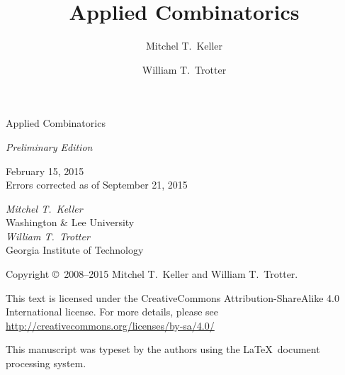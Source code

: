\documentclass[letterpaper,chapterprefix,numbers=noenddot,fontsize=10pt]{scrbook}
\numberwithin{figure}{chapter}
\numberwithin{section}{chapter}
\begin{document}
\begin{titlepage}
\begin{center}
\parbox{1in}{}

\vspace{.6in}
\Huge{\textsf{Applied Combinatorics}}

\vspace{24pt}
\LARGE{\textsf{\textsl{Preliminary Edition}}}
\vspace{36pt}

\Large{\textsf{February 15, 2015}}\\
\small{\textsf{Errors corrected as of September 21, 2015}}

\vfill \LARGE{\textsf{\textsl{Mitchel T.\
      Keller}}}\\\Large{\textsf{Washington \& Lee University}}\\\vspace{12pt}\LARGE{\textsf{\textsl{William T.\ Trotter}}}\\
  \Large{\textsf{Georgia Institute of Technology}}
\end{center}
\end{titlepage}
\thispagestyle{empty}
\parbox{1in}{ }
\vskip4.75in

\begin{center}
  \textsf{Copyright \copyright\ 2008--2015 Mitchel T.\ Keller and William
    T.\ Trotter.}

  \vspace{12pt}
  \textsf{This text is licensed under the CreativeCommons Attribution-ShareAlike 4.0 International license. For more details, please see
    \url{http://creativecommons.org/licenses/by-sa/4.0/}\\{\Huge \ccbysa}}
  


  \vspace{12pt}
  \textsf{This manuscript was typeset by the authors using the 
    \LaTeX\ document processing system.}
\end{center}


\author{Mitchel T.\ Keller}
\author{William T.\ Trotter}
\title{Applied Combinatorics}
\pagestyle{scrheadings}
\frontmatter
\end{document}
